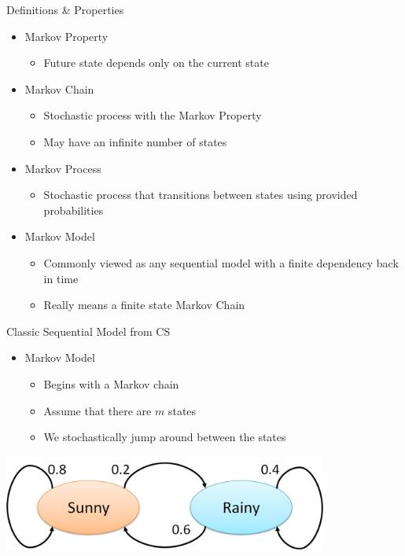 \documentclass[aspectratio=169]{beamer}
\begin{document}
\begin{frame}{Definitions \& Properties}

\begin{itemize}
\item Markov Property
\begin{itemize}
\item Future state depends only on the current state
\end{itemize}
\item Markov Chain
\begin{itemize}
\item Stochastic process with the Markov Property
\item May have an infinite number of states
\end{itemize}
\item Markov Process
\begin{itemize}
\item Stochastic process that transitions between states using provided probabilities
\end{itemize}
\item Markov Model
\begin{itemize}
\item Commonly viewed as any sequential model with a finite dependency back in time
\item Really means a finite state Markov Chain
\end{itemize}
\end{itemize}
\end{frame}
\begin{frame}{Classic Sequential Model from CS}

\begin{itemize}
\item Markov Model
	\begin{itemize}
	\item Begins with a Markov chain
	\item Assume that there are $m$ states
	\item We stochastically jump around between the states
	\end{itemize}
\end{itemize}
\includegraphics[width=0.8\textwidth]{lectSeq/markov-chain1.jpg}
\end{frame}
\end{document}
